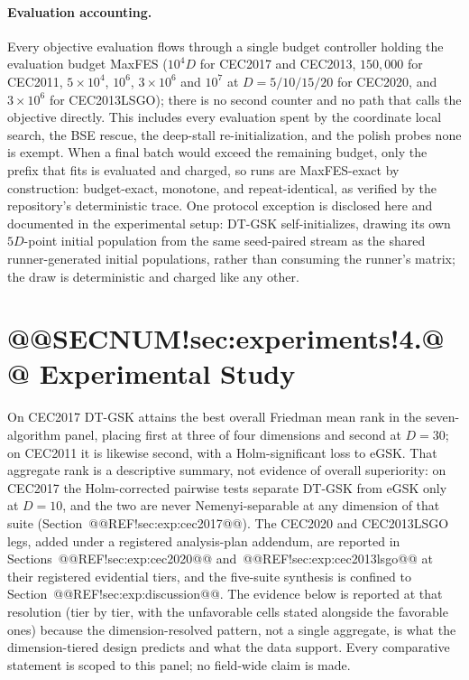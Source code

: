 \documentclass[10pt,a4paper]{article}
\newcommand{\dtgsk}{DT-GSK}
\newcommand{\egsk}{eGSK}
\begin{document}
\paragraph{Evaluation accounting.}
Every objective evaluation flows through a single
budget controller holding the evaluation budget MaxFES ($10^{4}D$ for
CEC2017 and CEC2013, $150{,}000$ for CEC2011, $5\times10^{4}$,
$10^{6}$, $3\times10^{6}$ and $10^{7}$ at $D = 5/10/15/20$ for CEC2020,
and $3\times10^{6}$ for CEC2013LSGO); there is
no second counter and no path that calls the objective
directly. 
This includes every evaluation spent by the coordinate local search, the
BSE rescue, the deep-stall re-initialization, and the polish probes
none is exempt.
When a final batch would exceed the remaining budget, only the prefix
that fits is evaluated and charged, so runs are MaxFES-exact by
construction: budget-exact, monotone, and repeat-identical, as
verified by the repository's deterministic
trace. 
One protocol exception is disclosed here and documented in the
experimental setup: \dtgsk{} self-initializes, drawing its own
$5D$-point initial population from the same seed-paired stream as the
shared runner-generated initial populations, rather than consuming the
runner's matrix; the draw is deterministic and charged like any
other. 






\section{@@SECNUM!sec:experiments!4.@@ Experimental Study}\label{sec:experiments}






On CEC2017 \dtgsk{} attains the best overall Friedman
mean rank in the seven-algorithm panel, placing first at three of four
dimensions and second at $D = 30$; on CEC2011 it is likewise second, with
a Holm-significant loss to \egsk{}. That aggregate rank is a descriptive
summary, not evidence of overall superiority: on CEC2017 the Holm-corrected
pairwise tests separate \dtgsk{} from \egsk{} only at $D = 10$, and the two
are never Nemenyi-separable at any dimension of that suite
(Section~@@REF!sec:exp:cec2017@@). The CEC2020 and CEC2013LSGO legs,
added under a registered analysis-plan addendum, are reported in
Sections~@@REF!sec:exp:cec2020@@ and~@@REF!sec:exp:cec2013lsgo@@ at their
registered evidential tiers, and the five-suite synthesis is confined to
Section~@@REF!sec:exp:discussion@@. The evidence below is reported at that
resolution (tier by tier, with the unfavorable cells stated alongside
the favorable ones) because the dimension-resolved pattern, not a single
aggregate, is what the dimension-tiered design predicts and what the data
support. Every comparative statement is scoped to this panel; no
field-wide claim is made.
\end{document}
